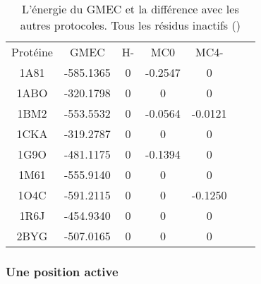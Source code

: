  
    \begin{table}[h]
      \centering

      \begin{tabular}{ccccccc}

        \toprule
        Protéine & GMEC & H- & MC0 & MC4- \\
        \cmidrule{1-5}
        1A81 & -585.1365 & 0 & -0.2547 & 0 \\
        1ABO & -320.1798 & 0 & 0 & 0 \\
        1BM2 & -553.5532 & 0 & -0.0564 & -0.0121 \\
        1CKA & -319.2787 & 0 & 0 & 0 \\
        1G9O & -481.1175 & 0 & -0.1394 & 0 \\
        1M61 & -555.9140 & 0 & 0 & 0 \\
        1O4C & -591.2115 & 0 & 0 & -0.1250 \\
        1R6J & -454.9340 & 0 & 0 & 0 \\
        2BYG & -507.0165 & 0 & 0 & 0 \\        
        \bottomrule


      \end{tabular}      
      \caption{L’énergie du GMEC et la différence avec les autres protocoles. Tous les résidus inactifs ()}
\label{tab:result_no_active}      
    \end{table}


   \subsubsection{Une position active}


